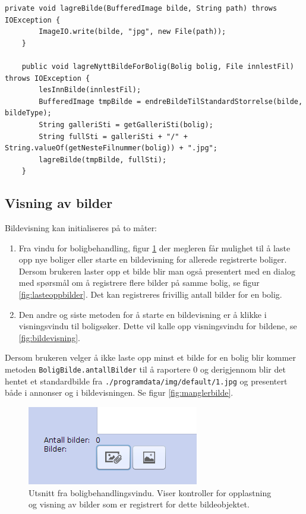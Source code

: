 \begin{lstlisting}[caption=BoligBilde.java: Lagring av et nytt eller tillegsbilde for en bolig, label=kode:bildelagring]
	private void lagreBilde(BufferedImage bilde, String path) throws IOException {
        ImageIO.write(bilde, "jpg", new File(path));
    }

	public void lagreNyttBildeForBolig(Bolig bolig, File innlestFil) throws IOException {
        lesInnBilde(innlestFil);
        BufferedImage tmpBilde = endreBildeTilStandardStorrelse(bilde, bildeType);
        String galleriSti = getGalleriSti(bolig);
        String fullSti = galleriSti + "/" + String.valueOf(getNesteFilnummer(bolig)) + ".jpg";
        lagreBilde(tmpBilde, fullSti);
    }
\end{lstlisting}

\subsection{Visning av bilder}
Bildevisning kan initialiseres på to måter: 
\begin{enumerate}
\item Fra vindu for boligbehandling, figur \ref{fig:bildebahndling} der megleren får mulighet til å laste opp nye boliger eller starte en bildevisning for allerede registrerte boliger. Dersom brukeren laster opp et bilde blir man også presentert med en dialog med spørsmål om å registrere flere bilder på samme bolig, se figur \ref{fig:lasteoppbilder}. Det kan registreres frivillig antall bilder for en bolig.
\item Den andre og siste metoden for å starte en bildevisning er å klikke i visningsvindu til boligsøker. Dette vil kalle opp visningsvindu for bildene, se \ref{fig:bildevisning}.
\end{enumerate}

Dersom brukeren velger å ikke laste opp minst et bilde for en bolig blir kommer metoden \texttt{BoligBilde.antallBilder} til å raportere 0 og derigjennom blir det hentet et standardbilde fra \texttt{./programdata/img/default/1.jpg} og presentert både i annonser og i bildevisningen. Se figur \ref{fig:manglerbilde}. 


\begin{figure}[ht!]
\center
 \includegraphics[trim=0cm 0.5cm 0cm 1.6cm,clip]{./img/produktdokumentasjon/bilder/1.png}
 \caption[Utsnitt fra boligbehandlingsvindu \# 1.]{Utsnitt fra boligbehandlingsvindu. Viser kontroller for opplastning og visning av bilder som er registrert for dette bildeobjektet.}
 \label{fig:bildebahndling}
\end{figure}


